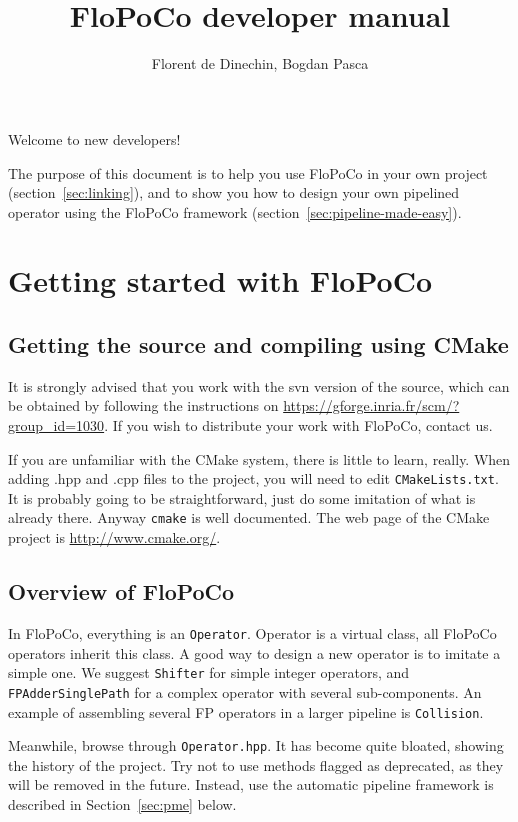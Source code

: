 \documentclass{article}
\title{\scalebox{0.3}{\mbox{}}\\
FloPoCo  developer manual
}
\author{Florent de Dinechin, Bogdan Pasca}
\begin{document}
 
\sloppy



\maketitle


Welcome to new developers! 

The purpose of this document is to help you use FloPoCo in your own
project (section~\ref{sec:linking}), and to show you how to design your own pipelined operator
using the FloPoCo framework (section~\ref{sec:pipeline-made-easy}). 

 \section{Getting started with FloPoCo\label{sec:getting-started}}


\subsection{Getting the source and compiling using CMake}

It is strongly advised that you work with the svn version of the
source, which can be obtained by following the instructions on
\url{https://gforge.inria.fr/scm/?group_id=1030}. If you wish to
distribute your work with FloPoCo,  contact us.

If you are unfamiliar with the CMake system, there is little to learn,
really. When adding .hpp and .cpp files to the project, you will need
to edit \texttt{CMakeLists.txt}. It is probably going to be straightforward,
just do some imitation of what is already there. Anyway \texttt{cmake} is well
documented. The web page of the CMake project is \url{http://www.cmake.org/}.


\subsection{Overview of FloPoCo}

In FloPoCo, everything is an \texttt{Operator}. Operator is a virtual
class, all FloPoCo operators inherit this class. A good way to design
a new operator is to imitate a simple one. We suggest
\texttt{Shifter} for simple integer operators, and \texttt{FPAdderSinglePath}
for a complex operator with several sub-components. An example of
assembling several FP operators in a larger pipeline is
\texttt{Collision}.

 Meanwhile, browse
through \texttt{Operator.hpp}. It has become quite bloated, showing
the history of the project. Try not to use methods flagged as
deprecated, as they will be removed in the future.  Instead, use the
automatic pipeline framework is described in Section~\ref{sec:pme}
below.
\end{document}
